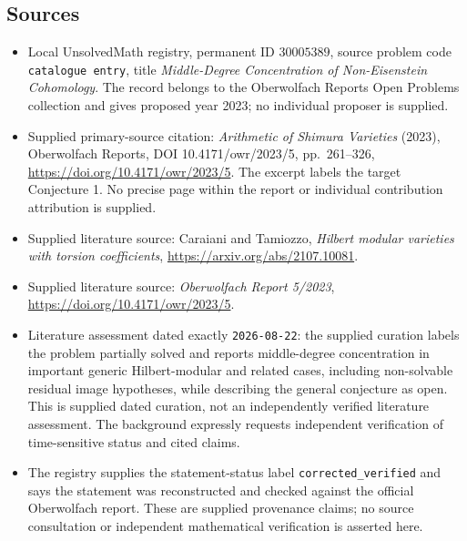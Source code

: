 \documentclass[11pt]{article}
\begin{document}
\subsection{Sources}
\begin{itemize}
\item Local UnsolvedMath registry, permanent ID \(30005389\), source problem code \texttt{catalogue entry}, title \emph{Middle-Degree Concentration of Non-Eisenstein Cohomology}. The record belongs to the Oberwolfach Reports Open Problems collection and gives proposed year 2023; no individual proposer is supplied.
\item Supplied primary-source citation: \emph{Arithmetic of Shimura Varieties} (2023), Oberwolfach Reports, DOI 10.4171/owr/2023/5, pp.\ 261--326, \url{https://doi.org/10.4171/owr/2023/5}. The excerpt labels the target Conjecture 1. No precise page within the report or individual contribution attribution is supplied.
\item Supplied literature source: Caraiani and Tamiozzo, \emph{Hilbert modular varieties with torsion coefficients}, \url{https://arxiv.org/abs/2107.10081}.
\item Supplied literature source: \emph{Oberwolfach Report 5/2023}, \url{https://doi.org/10.4171/owr/2023/5}.
\item Literature assessment dated exactly \texttt{2026-08-22}: the supplied curation labels the problem partially solved and reports middle-degree concentration in important generic Hilbert-modular and related cases, including non-solvable residual image hypotheses, while describing the general conjecture as open. This is supplied dated curation, not an independently verified literature assessment. The background expressly requests independent verification of time-sensitive status and cited claims.
\item The registry supplies the statement-status label \texttt{corrected\_verified} and says the statement was reconstructed and checked against the official Oberwolfach report. These are supplied provenance claims; no source consultation or independent mathematical verification is asserted here.
\end{itemize}
\end{document}

